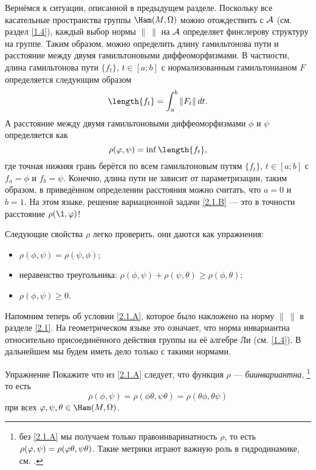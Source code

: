 Вернёмся к ситуации, описанной в предыдущем разделе.
Поскольку все касательные пространства группы $\Ham(M, \Omega)$ можно
отождествить с $\mathcal{A}$ (см. раздел \ref{1.4}), каждый выбор нормы
$\|\ \|$ на $\mathcal{A}$ определяет финслерову структуру на группе.
Таким образом, можно определить длину гамильтонова пути и расстояние между двумя гамильтоновыми диффеоморфизмами.
В частности, длина гамильтонова пути $\{f_t\}$, $t \in [a; b]$ с нормализованным гамильтонианом $F$ определяется следующим образом 
\[\length\{f_t\}=\int_a^b \| F_t \|\,dt.\]
А расстояние между двумя гамильтоновыми диффеоморфизмами $\phi$ и $\psi$ определяется как \index[symb]{$\rho$}
\[\rho (\phi, \psi) = \inf \length \{f_t\},\] 
где точная нижняя грань берётся по всем гамильтоновым путям $\{f_t\}$, $t \in [a; b]$ с $f_a = \phi$ и $f_b = \psi$.
Конечно, длина пути не зависит от параметризации, таким образом, в приведённом определении расстояния можно считать, что $a = 0$ и $b = 1$.
На этом языке, решение вариационной задачи
\ref{2.1.B} — это в точности расстояние $\rho (\1, \phi)$!

Следующие свойства $\rho$ легко проверить,
они даются как упражнения:
\begin{itemize}
\item $\rho (\phi, \psi) = \rho (\psi, \phi)$;
\item неравенство треугольника: $\rho (\phi, \psi) + \rho (\psi, \theta) \ge \rho (\phi, \theta)$;
\item $\rho (\phi, \psi) \ge 0$.
\end{itemize}

Напомним теперь об условии \ref{2.1.A}, которое было накложено на норму $\|\ \|$ в разделе \ref{2.1}.
На геометрическом языке это означает, что норма инвариантна относительно присоединённого действия группы на её алгебре Ли (см. \ref{1.4}).
В дальнейшем мы будем иметь дело только с такими нормами.

\begin{ex*}{Упражнение}
Покажите что из \ref{2.1.A} следует, что функция $\rho$ — \emph{биинвариантна},%
\footnote{без \ref{2.1.A} мы получаем только правоинваринатность $\rho$, то есть $\rho (\phi, \psi) \z= \rho (\phi\theta, \psi\theta)$.
Такие метрики играют важную роль в гидродинамике, см. \cite{AK}.}
то есть
\[\rho (\phi, \psi) = \rho (\phi \theta, \psi \theta) = \rho (\theta\phi, \theta\psi)\]
при всех $\phi, \psi, \theta \in \Ham (M, \Omega)$.
\end{ex*}

